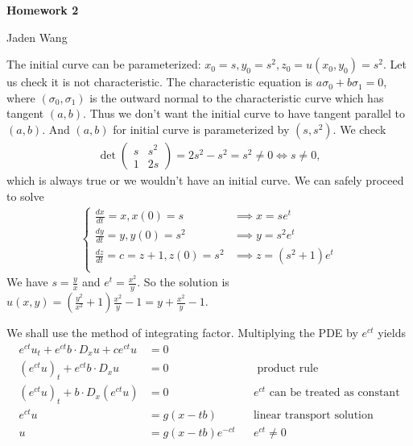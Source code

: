 \documentclass[12pt]{article}
\begin{document}
\centerline {\textsf{\textbf{\LARGE{Homework 2}}}}
\centerline {Jaden Wang}
\vspace{.15in}
\begin{problem}[2.1(i)]
The initial curve can be parameterized: $x_0=s, y_0=s^2, z_0=u(x_0,y_0)= s^2$. Let us check it is not characteristic. The characteristic equation is $ a \sigma_0 + b \sigma_1 = 0$, where $ ( \sigma_0, \sigma_1)$ is the outward normal to the characteristic curve which has tangent $ (a,b)$. Thus we don't want the initial curve to have tangent parallel to  $ (a,b)$. And $ (a,b)$ for initial curve is parameterized by  $ (s,s ^2)$. We check
 \begin{align*}
	 \det \begin{pmatrix} s& s ^2\\1 & 2s \end{pmatrix} = 2s ^2-s ^2 = s ^2 \neq 0 \iff s \neq 0,
\end{align*}
which is always true or we wouldn't have an initial curve. We can safely proceed to solve
\begin{align*}
	\begin{cases}
		\frac{d x}{d t} = x, x(0) = s&\implies x= s e^{t}\\
		\frac{d y}{d t} =y, y(0) = s ^2& \implies y= s ^2 e^{t}\\
		\frac{d z}{d t} = c=z+1, z(0) = s ^2& \implies z= (s ^2+1)e^{t}\\
	\end{cases}
\end{align*}
We have $ s=\frac{y}{x}$ and $ e^{t} = \frac{x^2}{ y}$. So the solution is $u(x,y)= \left( \frac{y^2}{x^2}+1 \right) \frac{x^2}{y}-1 = y+\frac{x^2}{y}-1$.
\end{problem}
\begin{problem}[2]
We shall use the method of integrating factor. Multiplying the PDE by $ e^{ct}$ yields
\begin{align*}
	e^{ct} u_t + e^{ct} b \cdot D_x u +c e^{ct} u&= 0 \\
	\left( e^{ct}u \right)_t + e^{ct} b \cdot D_x u &= 0 && \text{ product rule}  \\
	\left( e^{ct}u \right)_t + b \cdot D_x \left( e^{ct}u \right)  &= 0 && e^{ct}\text{ can be treated as constant}  \\
	e^{ct}u&= g(x-tb) && \text{linear transport solution}\\
	u&= g(x-tb) e^{-ct} && e^{ct} \neq 0 
\end{align*}

\end{problem}
\end{document}
